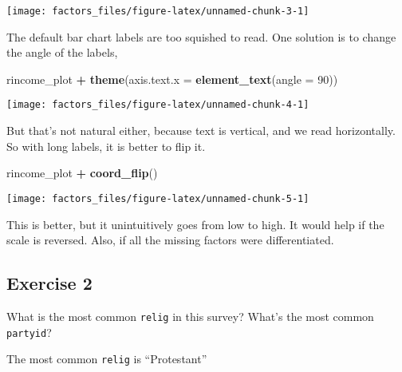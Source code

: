 \documentclass[]{book}
\newenvironment{Shaded}{\begin{snugshade}}{\end{snugshade}}
\newcommand{\CommentTok}[1]{\textcolor[rgb]{0.56,0.35,0.01}{\textit{#1}}}
\newcommand{\DataTypeTok}[1]{\textcolor[rgb]{0.13,0.29,0.53}{#1}}
\newcommand{\DecValTok}[1]{\textcolor[rgb]{0.00,0.00,0.81}{#1}}
\newcommand{\KeywordTok}[1]{\textcolor[rgb]{0.13,0.29,0.53}{\textbf{#1}}}
\newcommand{\NormalTok}[1]{#1}
\newcommand{\OperatorTok}[1]{\textcolor[rgb]{0.81,0.36,0.00}{\textbf{#1}}}
\newcommand{\StringTok}[1]{\textcolor[rgb]{0.31,0.60,0.02}{#1}}
\theoremstyle{definition}
\theoremstyle{definition}
\theoremstyle{definition}
\theoremstyle{remark}
\begin{document}
\begin{center}\texttt{[image: factors\_files/figure-latex/unnamed-chunk-3-1]} \end{center}

The default bar chart labels are too squished to read. One solution is
to change the angle of the labels,

\begin{Shaded}
\begin{Highlighting}[]
\NormalTok{rincome_plot }\OperatorTok{+}
\StringTok{  }\KeywordTok{theme}\NormalTok{(}\DataTypeTok{axis.text.x =} \KeywordTok{element_text}\NormalTok{(}\DataTypeTok{angle =} \DecValTok{90}\NormalTok{))}
\end{Highlighting}
\end{Shaded}

\begin{center}\texttt{[image: factors\_files/figure-latex/unnamed-chunk-4-1]} \end{center}

But that's not natural either, because text is vertical, and we read
horizontally. So with long labels, it is better to flip it.

\begin{Shaded}
\begin{Highlighting}[]
\NormalTok{rincome_plot }\OperatorTok{+}
\StringTok{  }\KeywordTok{coord_flip}\NormalTok{()}
\end{Highlighting}
\end{Shaded}

\begin{center}\texttt{[image: factors\_files/figure-latex/unnamed-chunk-5-1]} \end{center}

This is better, but it unintuitively goes from low to high. It would
help if the scale is reversed. Also, if all the missing factors were
differentiated.

\hypertarget{exercise-2-37}{%
\subsection{Exercise 2}\label{exercise-2-37}}

What is the most common \texttt{relig} in this survey? What's the most
common \texttt{partyid}?

The most common \texttt{relig} is ``Protestant''

\begin{Shaded}
\end{Shaded}
\end{document}
